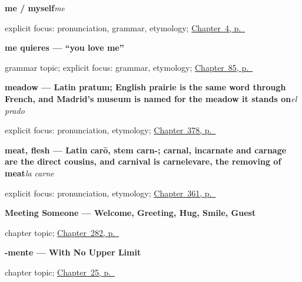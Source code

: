 \noindent\begin{minipage}[t]{\linewidth}
\raggedright
\textbf{me / myself}\enspace\emph{me}\par
\footnotesize explicit focus: pronunciation, grammar, etymology; \hyperref[ch:your-name]{Chapter~4, p.~\pageref*{ch:your-name}}
\end{minipage}\par\smallskip

\noindent\begin{minipage}[t]{\linewidth}
\raggedright
\textbf{me quieres — \textquotedblleft{}you love me\textquotedblright{}}\par
\footnotesize grammar topic; explicit focus: grammar, etymology; \hyperref[ch:pronoun-me-te]{Chapter~85, p.~\pageref*{ch:pronoun-me-te}}
\end{minipage}\par\smallskip

\noindent\begin{minipage}[t]{\linewidth}
\raggedright
\textbf{meadow — Latin pratum; English prairie is the same word through French, and Madrid's museum is named for the meadow it stands on}\enspace\emph{el prado}\par
\footnotesize explicit focus: pronunciation, etymology; \hyperref[ch:la-selva-y-el-prado]{Chapter~378, p.~\pageref*{ch:la-selva-y-el-prado}}
\end{minipage}\par\smallskip

\noindent\begin{minipage}[t]{\linewidth}
\raggedright
\textbf{meat, flesh — Latin carō, stem carn-; carnal, incarnate and carnage are the direct cousins, and carnival is carnelevare, the removing of meat}\enspace\emph{la carne}\par
\footnotesize explicit focus: pronunciation, etymology; \hyperref[ch:la-carne-y-la-leche]{Chapter~361, p.~\pageref*{ch:la-carne-y-la-leche}}
\end{minipage}\par\smallskip

\noindent\begin{minipage}[t]{\linewidth}
\raggedright
\textbf{Meeting Someone --- Welcome, Greeting, Hug, Smile, Guest}\par
\footnotesize chapter topic; \hyperref[ch:encuentro]{Chapter~282, p.~\pageref*{ch:encuentro}}
\end{minipage}\par\smallskip

\noindent\begin{minipage}[t]{\linewidth}
\raggedright
\textbf{-mente --- With No Upper Limit}\par
\footnotesize chapter topic; \hyperref[ch:friend-mente]{Chapter~25, p.~\pageref*{ch:friend-mente}}
\end{minipage}\par\smallskip

